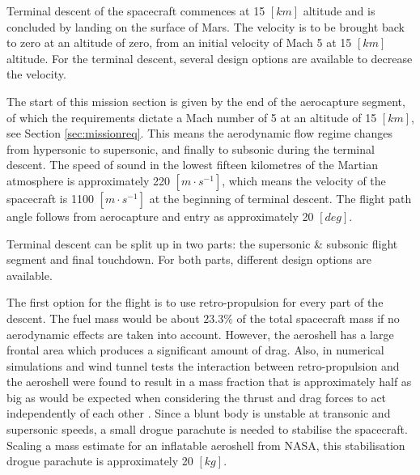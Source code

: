 Terminal descent of the spacecraft commences at 15 $[km]$ altitude and is concluded by landing on the surface of Mars. The velocity is to be brought back to zero at an altitude of zero, from an initial velocity of Mach 5 at 15 $[km]$ altitude. For the terminal descent, several design options are available to decrease the velocity.%

The start of this mission section is given by the end of the aerocapture segment, of which the requirements dictate a Mach number of 5 at an altitude of 15 $[km]$, see Section \ref{sec:missionreq}. This means the aerodynamic flow regime changes from hypersonic to supersonic, and finally to subsonic during the terminal descent. The speed of sound in the lowest fifteen kilometres of the Martian atmosphere is approximately 220 $[m\cdot s^{-1}]$, which means the velocity of the spacecraft is 1100 $[m\cdot s^{-1}]$ at the beginning of terminal descent. The flight path angle follows from aerocapture and entry as approximately 20 $[deg]$.%

Terminal descent can be split up in two parts: the supersonic \& subsonic flight segment and final touchdown. For both parts, different design options are available.

The first option for the flight is to use retro-propulsion for every part of the descent. The fuel mass would be about $23.3\%$ of the total spacecraft mass if no aerodynamic effects are taken into account. However, the aeroshell has a large frontal area which produces a significant amount of drag. Also, in numerical simulations and wind tunnel tests the interaction between retro-propulsion and the aeroshell were found to result in a mass fraction that is approximately half as big as would be expected when considering the thrust and drag forces to act independently of each other \cite{Korzun2009}. Since a blunt body is unstable at transonic and supersonic speeds, a small drogue parachute is needed to stabilise the spacecraft. Scaling a mass estimate for an inflatable aeroshell from NASA, this stabilisation drogue parachute is approximately 20 $[kg]$.

